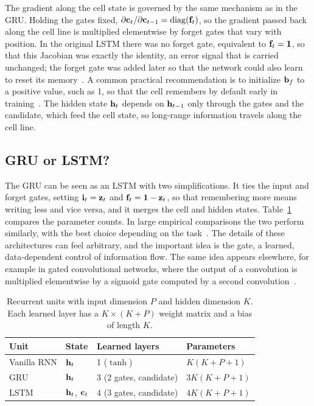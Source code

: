 The gradient along the cell state is governed by the same mechanism as in the GRU. Holding the gates fixed, $\partial\mathbf{c}_t/\partial\mathbf{c}_{t-1}=\operatorname{diag}(\mathbf{f}_t)$, so the gradient passed back along the cell line is multiplied elementwise by forget gates that vary with position. In the original LSTM there was no forget gate, equivalent to $\mathbf{f}_t=\mathbf{1}$, so that this Jacobian was exactly the identity, an error signal that is carried unchanged; the forget gate was added later so that the network could also learn to reset its memory~\citep{gers2000}. A common practical recommendation is to initialize $\mathbf{b}_f$ to a positive value, such as 1, so that the cell remembers by default early in training~\citep{jozefowicz2015}. The hidden state $\mathbf{h}_t$ depends on $\mathbf{h}_{t-1}$ only through the gates and the candidate, which feed the cell state, so long-range information travels along the cell line.

\subsection{GRU or LSTM?}

The GRU can be seen as an LSTM with two simplifications. It ties the input and forget gates, setting $\mathbf{i}_t=\mathbf{z}_t$ and $\mathbf{f}_t=\mathbf{1}-\mathbf{z}_t$, so that remembering more means writing less and vice versa, and it merges the cell and hidden states. Table~\ref{tab:rnn_params} compares the parameter counts. In large empirical comparisons the two perform similarly, with the best choice depending on the task~\citep{chung2014,jozefowicz2015}. The details of these architectures can feel arbitrary, and the important idea is the gate, a learned, data-dependent control of information flow. The same idea appears elsewhere, for example in gated convolutional networks, where the output of a convolution is multiplied elementwise by a sigmoid gate computed by a second convolution~\citep{dauphin2017}.

\begin{table}[t]
  \centering
  \caption{Recurrent units with input dimension $P$ and hidden dimension $K$. Each learned layer has a $K\times(K+P)$ weight matrix and a bias of length $K$.}
  \label{tab:rnn_params}
  \begin{tabular}{llll}
    \toprule
    Unit & State & Learned layers & Parameters \\
    \midrule
    Vanilla RNN & $\mathbf{h}_t$ & 1 ($\tanh$) & $K(K+P+1)$ \\
    GRU & $\mathbf{h}_t$ & 3 (2 gates, candidate) & $3K(K+P+1)$ \\
    LSTM & $\mathbf{h}_t$, $\mathbf{c}_t$ & 4 (3 gates, candidate) & $4K(K+P+1)$ \\
    \bottomrule
  \end{tabular}
\end{table}

